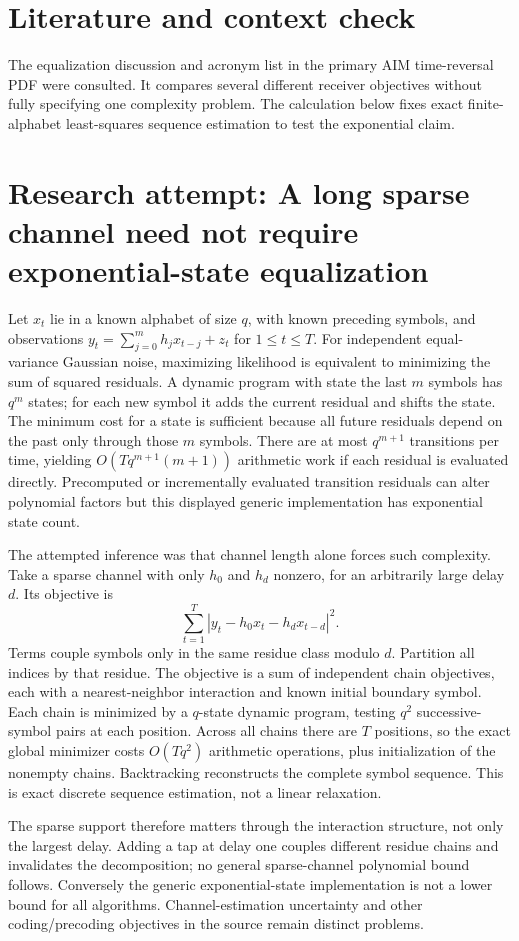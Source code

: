 \documentclass[11pt]{article}
\begin{document}
\section{Literature and context check}
The equalization discussion and acronym list in the primary AIM time-reversal
PDF were consulted. It compares several different receiver objectives without
fully specifying one complexity problem. The calculation below fixes exact
finite-alphabet least-squares sequence estimation to test the exponential claim.
\section{Research attempt: A long sparse channel need not require exponential-state equalization}
Let $x_t$ lie in a known alphabet of size $q$, with known preceding symbols,
and observations
$y_t=\sum_{j=0}^m h_jx_{t-j}+z_t$ for $1\le t\le T$.
For independent equal-variance Gaussian noise, maximizing likelihood is
equivalent to minimizing the sum of squared residuals. A dynamic program with
state the last $m$ symbols has $q^m$ states; for each new symbol it adds the
current residual and shifts the state. The minimum cost for a state is sufficient
because all future residuals depend on the past only through those $m$ symbols.
There are at most $q^{m+1}$ transitions per time, yielding
$O(Tq^{m+1}(m+1))$ arithmetic work if each residual is evaluated directly.
Precomputed or incrementally evaluated transition residuals can alter polynomial
factors but this displayed generic implementation has exponential state count.

The attempted inference was that channel length alone forces such complexity.
Take a sparse channel with only $h_0$ and $h_d$ nonzero, for an arbitrarily large
delay $d$. Its objective is
\[
 \sum_{t=1}^T|y_t-h_0x_t-h_dx_{t-d}|^2.
\]
Terms couple symbols only in the same residue class modulo $d$. Partition all
indices by that residue. The objective is a sum of independent chain objectives,
each with a nearest-neighbor interaction and known initial boundary symbol.
Each chain is minimized by a $q$-state dynamic program, testing $q^2$
successive-symbol pairs at each position. Across all chains there are $T$
positions, so the exact global minimizer costs $O(Tq^2)$ arithmetic operations,
plus initialization of the nonempty chains. Backtracking reconstructs the
complete symbol sequence. This is exact discrete sequence estimation, not a
linear relaxation.

The sparse support therefore matters through the interaction structure, not
only the largest delay. Adding a tap at delay one couples different residue
chains and invalidates the decomposition; no general sparse-channel polynomial
bound follows. Conversely the generic exponential-state implementation is not
a lower bound for all algorithms. Channel-estimation uncertainty and other
coding/precoding objectives in the source remain distinct problems.
\end{document}
